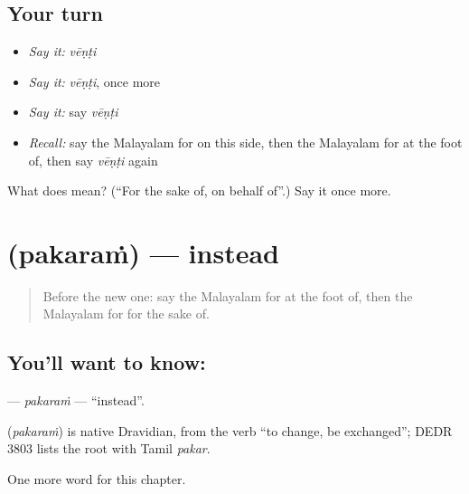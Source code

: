 \subsection*{Your turn}
\begin{itemize}
\raggedright
  \item \emph{Say it:} \emph{vēṇṭi}
  \item \emph{Say it:} \emph{vēṇṭi}, once more
  \item \emph{Say it:} say \emph{vēṇṭi}
  \item \emph{Recall:} say the Malayalam for on this side, then the Malayalam for at the foot of, then say \emph{vēṇṭi} again
\end{itemize}

\begin{tcolorbox}[breakable,colback=teal!4,colframe=teal!35!black,title={Before you move on}]
What does  mean? (\textquotedblleft{}For the sake of, on behalf of\textquotedblright{}.) Say it once more.
\end{tcolorbox}
\section[\texorpdfstring{\ml{പകരം} (pakaraṁ)}{പകരം (pakaraṁ)}]{ (pakaraṁ) — instead}

\label{lesson:ML-C200-pakaram}



\begin{quote}
Before the new one: say the Malayalam for at the foot of, then the Malayalam for for the sake of.
\end{quote}

\subsection*{You'll want to know: }
\textbf{} — \emph{pakaraṁ} — \textquotedblleft{}instead\textquotedblright{}.

\begin{cousinweb}
\textbf{} (\emph{pakaraṁ}) is native Dravidian, from the verb \textquotedblleft{}to change, be exchanged\textquotedblright{}; DEDR 3803 lists the root with Tamil \emph{pakar}.
\end{cousinweb}

\begin{grammarlens}[title={What you've built}]
One more word for this chapter.
\end{grammarlens}

